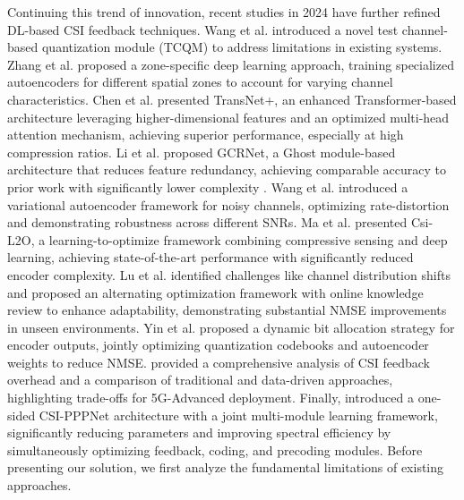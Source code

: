 \documentclass[lettersize,journal]{IEEEtran}
\begin{document}
Continuing this trend of innovation, recent studies in 2024 have further refined DL-based CSI feedback techniques. Wang et al. \cite{wang2024better} introduced a novel test channel-based quantization module (TCQM) to address limitations in existing systems. Zhang et al. \cite{zhang2024zone} proposed a zone-specific deep learning approach, training specialized autoencoders for different spatial zones to account for varying channel characteristics. Chen et al. \cite{chen2024transnet} presented TransNet+, an enhanced Transformer-based architecture leveraging higher-dimensional features and an optimized multi-head attention mechanism, achieving superior performance, especially at high compression ratios. Li et al. \cite{li2024lightweight} proposed GCRNet, a Ghost module-based architecture that reduces feature redundancy, achieving comparable accuracy to prior work with significantly lower complexity \cite{ji2021clnet}. Wang et al. \cite{wang2024variational} introduced a variational autoencoder framework for noisy channels, optimizing rate-distortion and demonstrating robustness across different SNRs. Ma et al. \cite{Ma2024} presented Csi-L2O, a learning-to-optimize framework combining compressive sensing and deep learning, achieving state-of-the-art performance with significantly reduced encoder complexity. Lu et al. \cite{prac2024} identified challenges like channel distribution shifts and proposed an alternating optimization framework with online knowledge review to enhance adaptability, demonstrating substantial NMSE improvements in unseen environments. Yin et al. \cite{quant2024} proposed a dynamic bit allocation strategy for encoder outputs, jointly optimizing quantization codebooks and autoencoder weights to reduce NMSE. \cite{CSICompression2024} provided a comprehensive analysis of CSI feedback overhead and a comparison of traditional and data-driven approaches, highlighting trade-offs for 5G-Advanced deployment. Finally, \cite{Guo2024} introduced a one-sided CSI-PPPNet architecture with a joint multi-module learning framework, significantly reducing parameters and improving spectral efficiency by simultaneously optimizing feedback, coding, and precoding modules.
Before presenting our solution, we first analyze the fundamental limitations of existing approaches.
\end{document}
